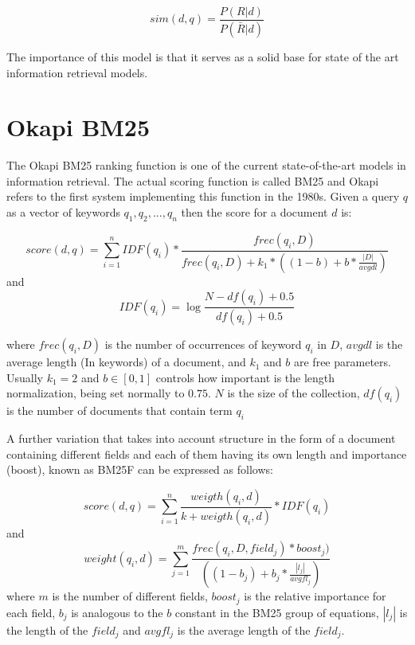 $$sim(d,q) = \frac{ P(R|d)} {P(\bar{R} |d)} $$

The importance of this model is that it serves as a solid base for state of the art information retrieval models.

\section{Okapi BM25}

The Okapi BM25 ranking function is one of the current state-of-the-art models in information retrieval\cite{okapibm25}. The actual scoring function is called BM25 and Okapi refers to the first system implementing this function in the 1980s. 
Given a query $q$ as a vector of keywords $q_{1}, q_{2}, ... , q_{n}$ then the score for a document $d$ is:

$$score(d, q) = \sum_{i=1}^{n}IDF{(q_i)}*\frac{ frec(q_i, D)}{frec(q_i, D)+k_1*((1-b)+b*\frac{|D|}{avgdl})} $$
and $$IDF(q_i) = \log{\frac{N - df(q_i)+0.5}{df(q_i)+0.5}} $$

where $frec(q_i, D)$ is the number of occurrences of keyword $q_i$ in $D$, $avgdl$ is the average length (In keywords) of a document, and $k_1$ and $b$ are free parameters. Usually $k_1 = 2$ and $b \in [0, 1]$ controls how important is the length normalization, being set normally to $0.75$. $N$ is the size of the collection, $df(q_i)$ is the number of documents that contain term $q_i$ 

A further variation that takes into account structure in the form of a document containing different fields and each of them having its own length and importance (boost), known as BM25F can be expressed as follows:


$$score(d, q) = \sum_{i=1}^{n} \frac{weigth(q_i, d)}{k+ weigth(q_i, d)} * IDF(q_i)$$
and 
$$weight(q_i, d) = \sum_{j=1}^m \frac{frec(q_i, D, field_j)*boost_j)}{((1-b_j) + b_j*\frac{|l_j|}{avgfl_j})} $$
where $m$ is the number of different fields, $boost_j$ is the relative importance for each field, $b_j$ is analogous to the $b$ constant in the BM25 group of equations, $|l_j|$ is the length of the $field_j$ and $avgfl_j$ is the average length of the $field_j$.

